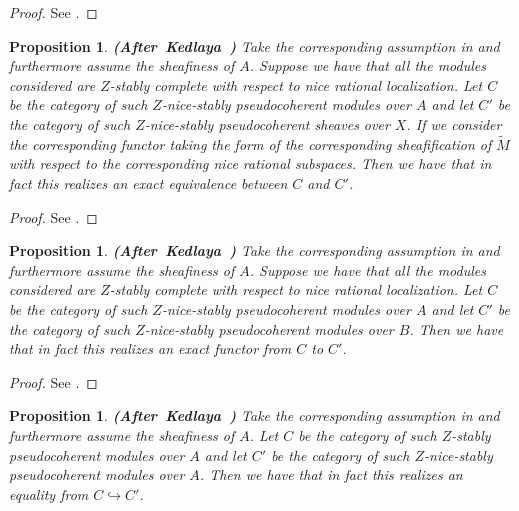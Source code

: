 \documentclass[12pt]{amsart}
\newtheorem{proposition}[theorem]{Proposition}
\theoremstyle{definition}
\numberwithin{equation}{section}
\begin{document}
\begin{proof}
See \cite[Lemma 1.9.13]{Ked2}.	
\end{proof}




\begin{proposition}  \mbox{\bf{(After Kedlaya \cite[Lemma 1.9.16]{Ked2})}}
Take the corresponding assumption in \cite[1.7.1]{Ked2} and furthermore assume the sheafiness of $A$. Suppose we have that all the modules considered are $Z$-stably complete with respect to nice rational localization. Let $C$ be the category of such $Z$-nice-stably pseudocoherent modules over $A$ and let $C'$ be the category of such $Z$-nice-stably pseudocoherent sheaves over $X$. If we consider the corresponding functor taking the form of the corresponding sheafification of $\widetilde{M}$	with respect to the corresponding nice rational subspaces. Then we have that in fact this realizes an exact equivalence between $C$ and $C'$.
\end{proposition}



\begin{proof}
See \cite[Lemma 1.9.16]{Ked2}.	
\end{proof}



\begin{proposition}  \mbox{\bf{(After Kedlaya \cite[Lemma 1.9.17]{Ked2})}}
Take the corresponding assumption in \cite[1.7.1]{Ked2} and furthermore assume the sheafiness of $A$. Suppose we have that all the modules considered are $Z$-stably complete with respect to nice rational localization. Let $C$ be the category of such $Z$-nice-stably pseudocoherent modules over $A$ and let $C'$ be the category of such $Z$-nice-stably pseudocoherent modules over $B$. Then we have that in fact this realizes an exact functor from $C$ to $C'$.
\end{proposition}



\begin{proof}
See \cite[Lemma 1.9.17]{Ked2}.	
\end{proof}



\begin{proposition}  \mbox{\bf{(After Kedlaya \cite[Corollary 1.9.18]{Ked2})}}
Take the corresponding assumption in \cite[1.7.1]{Ked2} and furthermore assume the sheafiness of $A$. Let $C$ be the category of such $Z$-stably pseudocoherent modules over $A$ and let $C'$ be the category of such $Z$-nice-stably pseudocoherent modules over $A$. Then we have that in fact this realizes an equality from $C\hookrightarrow C'$.
\end{proposition}
\end{document}
